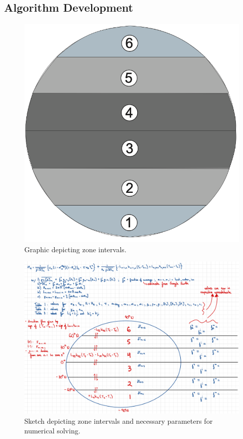 \documentclass[12pt]{article}
\begin{document}
\subsection{Algorithm Development}
\begin{figure}[H]
    \centering
    \includegraphics[scale=0.3]{zones.png}
    \caption{Graphic depicting zone intervals.}
    \label{fig:zones}
\end{figure}
\FloatBarrier

\begin{figure}[H]
    \centering
    \includegraphics[scale=0.3]{Graphicalg.pdf}
    \caption{
        Sketch depicting zone intervals and necessary parameters for numerical
        solving.
    }
    \label{fig:graphicalg}
\end{figure}
\FloatBarrier
\end{document}
